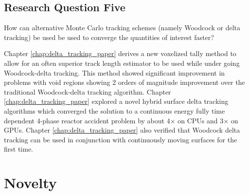\subsection{Research Question Five}

\begin{displayquote}
How can alternative Monte Carlo tracking schemes (namely Woodcock or delta tracking) be used be used to converge the quantities of interest faster?
\end{displayquote}
Chapter \ref{chap:delta_tracking_paper} derives a new voxelized tally method to allow for an often superior track length estimator to be used while under going Woodcock-delta tracking.
This method showed significant improvement in problems with void regions showing 2 orders of magnitude improvement over the traditional Woodcock-delta tracking algorithm.
Chapter \ref{chap:delta_tracking_paper} explored a novel hybrid surface delta tracking algorithms which converged the solution to a continuous energy fully time dependent 4-phase reactor accident problem by about 4$\times$ on CPUs and 3$\times$ on GPUs.
Chapter \ref{chap:delta_tracking_paper} also verified that Woodcock delta tracking can be used in conjunction with continuously moving surfaces for the first time.


\section{Novelty}

